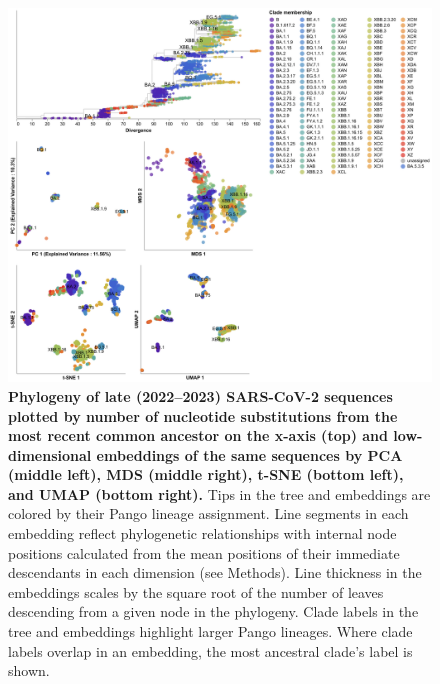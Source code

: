 \begin{figure}[!h]
\includegraphics[width=0.9\columnwidth]{figures/sarscov2-test-embeddings-by-Nextclade_pango_collapsed-clade.png}
\caption{{\bf Phylogeny of late (2022--2023) SARS-CoV-2 sequences plotted by number of nucleotide substitutions from the most recent common ancestor on the x-axis (top) and low-dimensional embeddings of the same sequences by PCA (middle left), MDS (middle right), t-SNE (bottom left), and UMAP (bottom right).}
  Tips in the tree and embeddings are colored by their Pango lineage assignment.
  Line segments in each embedding reflect phylogenetic relationships with internal node positions calculated from the mean positions of their immediate descendants in each dimension (see Methods).
  Line thickness in the embeddings scales by the square root of the number of leaves descending from a given node in the phylogeny.
  Clade labels in the tree and embeddings highlight larger Pango lineages.
  Where clade labels overlap in an embedding, the most ancestral clade's label is shown.
}
\label{S_Fig_sarscov2_late_embeddings_by_Pango}
\end{figure}

